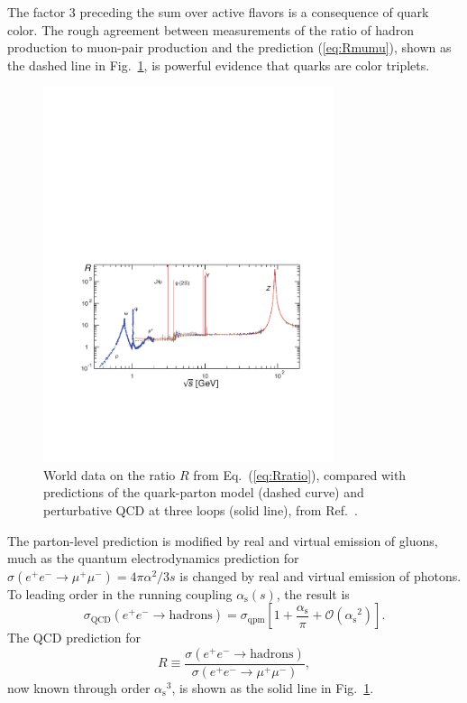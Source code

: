 \documentclass[11pt,prb,groupedaddress,nofootinbib,showpacs,floatfix]{revtex4-1}
\newcommand{\Eqn}[1]{Eq.~(\ref{#1})}
\newcommand{\alphas}{\ensuremath{\alpha_{\mathrm{s}}}}
\begin{document}
The factor 3 preceding the sum over active flavors is a
consequence of quark color. The rough agreement between measurements of
the ratio of hadron production to muon-pair production and the
prediction (\ref{eq:Rmumu}), shown as the dashed line in
Fig.~\ref{fig:Rmumu}, is powerful evidence that quarks are color
triplets.
%
\begin{figure}[bt] 
	\includegraphics[width=8.5cm]{fig/fig6}
	\vspace{10pt}
	\caption{World data on the ratio $R$ from \Eqn{eq:Rratio}, compared 
        with predictions of the quark-parton model (dashed curve) and
		perturbative QCD at three loops (solid line), from
		Ref.~.}
	\label{fig:Rmumu}
\end{figure}

The parton-level prediction is modified by real and virtual emission of
gluons, much as the quantum electrodynamics prediction for
$\sigma(e^+e^- \to \mu^+\mu^-) = {4\pi\alpha^2}/{3s}$ is changed by
real and virtual emission of photons. To leading order in the running
coupling $\alphas(s)$, the result is
\begin{equation}
    \sigma_{\mathrm{QCD}}(e^+e^- \to \mathrm{hadrons}) =
    \sigma_{\mathrm{qpm}}\left[ 1 + \frac{\alphas}{\pi} +
    \mathcal{O}(\alphas^2) \right].
    \label{eq:RinQCD}
\end{equation}
The QCD prediction for
\begin{equation}
    R \equiv \frac{\sigma(e^+e^-\to\mathrm{hadrons})}%
        {\sigma(e^+e^- \to \mu^+\mu^-)},
    \label{eq:Rratio}
\end{equation}
now known through order $\alphas^3$, is shown as the solid 
line in Fig.~\ref{fig:Rmumu}. 
\end{document}

